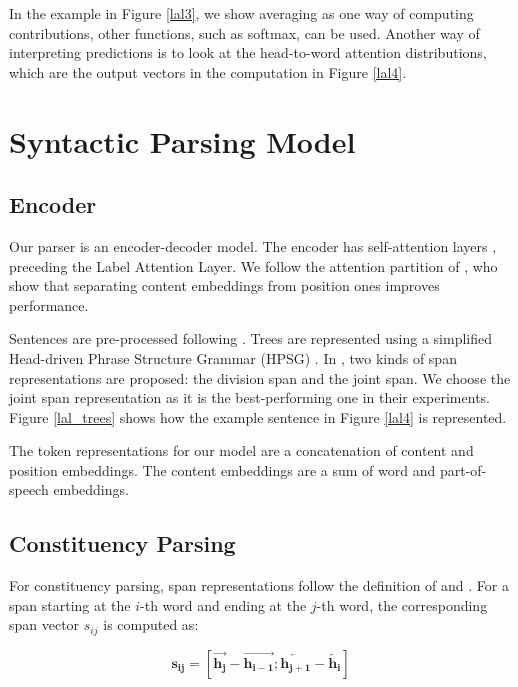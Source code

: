 \documentclass[11pt,a4paper]{article}
\begin{document}
In the example in Figure \ref{lal3}, we show averaging as one way of computing contributions, other functions, such as softmax, can be used. Another way of interpreting predictions is to look at the head-to-word attention distributions, which are the output vectors in the computation in Figure \ref{lal4}.

\section{Syntactic Parsing Model}
\label{section_parser}

\subsection{Encoder}
Our parser is an encoder-decoder model. The encoder has self-attention layers \cite{vaswani2017attention}, preceding the Label Attention Layer. We follow the attention partition of \citet{kitaev2018constituency}, who show that separating content embeddings from position ones improves performance.

Sentences are pre-processed following \citet{zhou2019head}. Trees are represented using a simplified Head-driven Phrase Structure Grammar (HPSG) \cite{pollard1994head}. In \citet{zhou2019head},   two kinds of span representations are proposed: the division span and the joint span. We choose the joint span representation as it is the best-performing one in their experiments.  Figure \ref{lal_trees} shows how the example sentence in Figure \ref{lal4} is represented.

The token representations for our model are a concatenation of content and position embeddings. The content embeddings are a sum of word and part-of-speech embeddings.

\subsection{Constituency Parsing}

For constituency parsing, span representations follow the definition of \citet{gaddy2018s} and \citet{kitaev2018constituency}. For a span starting at the $i$-th word and ending at the $j$-th word, the corresponding span vector $s_{ij}$ is computed as:

\begin{equation}
    \mathbf{s_{ij}} = \left[\overrightarrow{\mathbf{h_j}} - \overrightarrow{\mathbf{h_{i-1}}}; \overleftarrow{\mathbf{h_{j+1}}} - \overleftarrow{\mathbf{h_i}}\right]
\end{equation}
\end{document}
